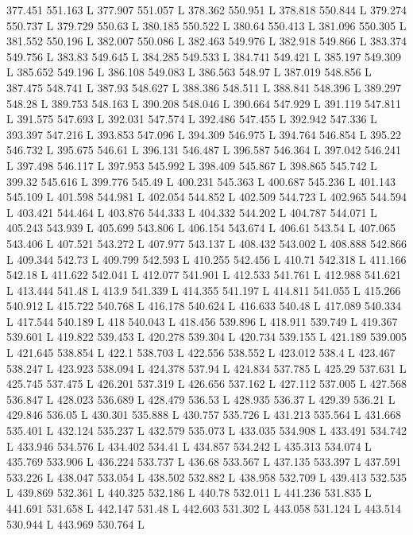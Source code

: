 377.451 551.163 L
377.907 551.057 L
378.362 550.951 L
378.818 550.844 L
379.274 550.737 L
379.729 550.63 L
380.185 550.522 L
380.64 550.413 L
381.096 550.305 L
381.552 550.196 L
382.007 550.086 L
382.463 549.976 L
382.918 549.866 L
383.374 549.756 L
383.83 549.645 L
384.285 549.533 L
384.741 549.421 L
385.197 549.309 L
385.652 549.196 L
386.108 549.083 L
386.563 548.97 L
387.019 548.856 L
387.475 548.741 L
387.93 548.627 L
388.386 548.511 L
388.841 548.396 L
389.297 548.28 L
389.753 548.163 L
390.208 548.046 L
390.664 547.929 L
391.119 547.811 L
391.575 547.693 L
392.031 547.574 L
392.486 547.455 L
392.942 547.336 L
393.397 547.216 L
393.853 547.096 L
394.309 546.975 L
394.764 546.854 L
395.22 546.732 L
395.675 546.61 L
396.131 546.487 L
396.587 546.364 L
397.042 546.241 L
397.498 546.117 L
397.953 545.992 L
398.409 545.867 L
398.865 545.742 L
399.32 545.616 L
399.776 545.49 L
400.231 545.363 L
400.687 545.236 L
401.143 545.109 L
401.598 544.981 L
402.054 544.852 L
402.509 544.723 L
402.965 544.594 L
403.421 544.464 L
403.876 544.333 L
404.332 544.202 L
404.787 544.071 L
405.243 543.939 L
405.699 543.806 L
406.154 543.674 L
406.61 543.54 L
407.065 543.406 L
407.521 543.272 L
407.977 543.137 L
408.432 543.002 L
408.888 542.866 L
409.344 542.73 L
409.799 542.593 L
410.255 542.456 L
410.71 542.318 L
411.166 542.18 L
411.622 542.041 L
412.077 541.901 L
412.533 541.761 L
412.988 541.621 L
413.444 541.48 L
413.9 541.339 L
414.355 541.197 L
414.811 541.055 L
415.266 540.912 L
415.722 540.768 L
416.178 540.624 L
416.633 540.48 L
417.089 540.334 L
417.544 540.189 L
418 540.043 L
418.456 539.896 L
418.911 539.749 L
419.367 539.601 L
419.822 539.453 L
420.278 539.304 L
420.734 539.155 L
421.189 539.005 L
421.645 538.854 L
422.1 538.703 L
422.556 538.552 L
423.012 538.4 L
423.467 538.247 L
423.923 538.094 L
424.378 537.94 L
424.834 537.785 L
425.29 537.631 L
425.745 537.475 L
426.201 537.319 L
426.656 537.162 L
427.112 537.005 L
427.568 536.847 L
428.023 536.689 L
428.479 536.53 L
428.935 536.37 L
429.39 536.21 L
429.846 536.05 L
430.301 535.888 L
430.757 535.726 L
431.213 535.564 L
431.668 535.401 L
432.124 535.237 L
432.579 535.073 L
433.035 534.908 L
433.491 534.742 L
433.946 534.576 L
434.402 534.41 L
434.857 534.242 L
435.313 534.074 L
435.769 533.906 L
436.224 533.737 L
436.68 533.567 L
437.135 533.397 L
437.591 533.226 L
438.047 533.054 L
438.502 532.882 L
438.958 532.709 L
439.413 532.535 L
439.869 532.361 L
440.325 532.186 L
440.78 532.011 L
441.236 531.835 L
441.691 531.658 L
442.147 531.48 L
442.603 531.302 L
443.058 531.124 L
443.514 530.944 L
443.969 530.764 L
